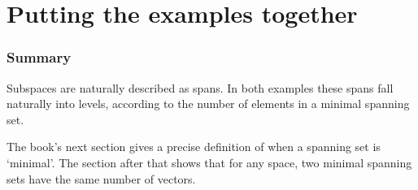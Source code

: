 \section{Putting the examples together}
\begin{frame}
  \frametitle{Summary}

Subspaces are naturally described as spans.
In both examples these spans fall naturally into levels, 
according to the 
number of elements in a minimal spanning set. 

The book's next section gives a precise definition of 
when a spanning set is `minimal'.
The section after that shows that for any space, 
two minimal spanning sets have the same number of vectors.
\end{frame}

% 

